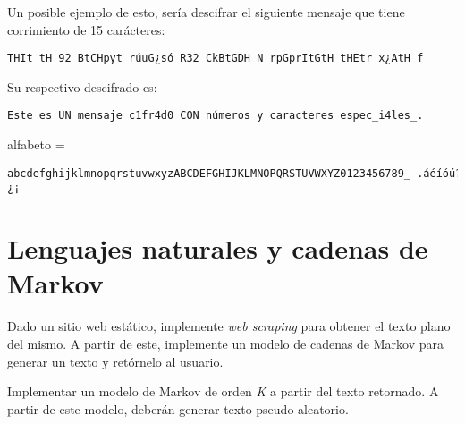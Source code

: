 Un posible ejemplo de esto, sería descifrar el siguiente mensaje que tiene corrimiento de 15 carácteres:
\begin{verbatim}
THIt tH 92 BtCHpyt rúuG¿só R32 CkBtGDH N rpGprItGtH tHEtr_x¿AtH_f    
\end{verbatim}

Su respectivo descifrado es:
\begin{verbatim}
Este es UN mensaje c1fr4d0 CON números y caracteres espec_i4les_.    
\end{verbatim}

alfabeto = 
\begin{verbatim}
abcdefghijklmnopqrstuvwxyzABCDEFGHIJKLMNOPQRSTUVWXYZ0123456789_-.áéíóú?!¿¡
\end{verbatim}



\section*{Lenguajes naturales y cadenas de Markov}

Dado un sitio web estático, implemente \textit{web scraping} para obtener el texto plano del mismo. A partir de este, implemente un modelo de cadenas de Markov para generar un texto y retórnelo al usuario.

Implementar un modelo de Markov de orden \textit{K} a partir del texto retornado. A partir de este modelo, deberán generar texto pseudo-aleatorio.

